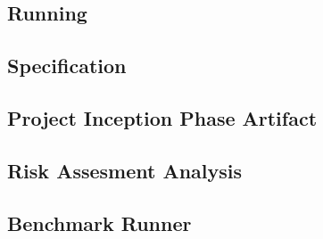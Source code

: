 \subsection{Running \thename{}}
\label{sec:appendix:make}

\subsection{\thename{} Specification}
\label{sec:appendix:spec}


\subsection{Project Inception Phase Artifact}
\label{appendix:inception-artifact}


\subsection{Risk Assesment Analysis}
\label{appendix:risk-assessment}

\subsection{Benchmark Runner}
\label{appendix:benchmark}

